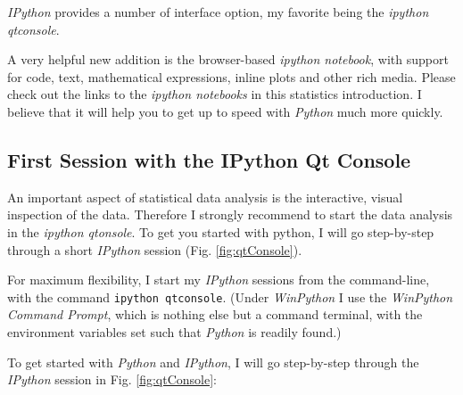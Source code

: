 \emph{IPython} provides a number of interface option, my favorite being the \emph{ipython qtconsole}.

A very helpful new addition is the browser-based \emph{ipython notebook}, with support for code, text, mathematical expressions, inline plots and other rich media. Please check out the links to the \emph{ipython
notebooks} in this statistics introduction. I believe that it will  help you to get up to speed with \emph{Python} much more quickly.

\subsection{First Session with the IPython Qt Console}

An important aspect of statistical data analysis is the interactive, visual inspection of the data. Therefore I strongly recommend to start the data analysis in the \emph{ipython qtonsole}. To get you started with python, I will go step-by-step through a short \emph{IPython} session (Fig. \ref{fig:qtConsole}).

For maximum flexibility, I start my \emph{IPython} sessions from the command-line, with the command \lstinline{ipython qtconsole}. (Under \emph{WinPython} I use the \emph{WinPython Command Prompt}, which is nothing else but a command terminal, with the environment variables set such that \emph{Python} is readily found.)

To get started with \emph{Python} and \emph{IPython}, I will go step-by-step through the \emph{IPython} session in Fig. \ref{fig:qtConsole}:

